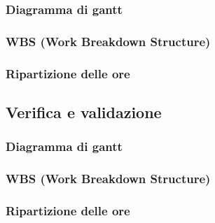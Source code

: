             \subsubsection{Diagramma di gantt}
            \subsubsection{WBS (Work Breakdown Structure)}
            \subsubsection{Ripartizione delle ore}

        \subsection{Verifica e validazione}
            \subsubsection{Diagramma di gantt}
            \subsubsection{WBS (Work Breakdown Structure)}
            \subsubsection{Ripartizione delle ore}
